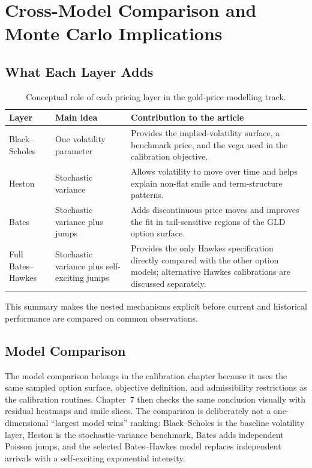 \documentclass[a4paper,10pt,titlepage,oneside,openany]{book}
\theoremstyle{plain}
\theoremstyle{definition}
\theoremstyle{remark}
\begin{document}
\chapter{Cross-Model Comparison and Monte Carlo Implications}

\section{What Each Layer Adds}

\begin{table}[H]
\centering
\begin{tabularx}{\textwidth}{@{}p{3.2cm}p{4.2cm}X@{}}
\toprule
\textbf{Layer} & \textbf{Main idea} & \textbf{Contribution to the article} \\
\midrule
Black--Scholes & One volatility parameter & Provides the implied-volatility surface, a benchmark price, and the vega used in the calibration objective. \\
Heston & Stochastic variance & Allows volatility to move over time and helps explain non-flat smile and term-structure patterns. \\
Bates & Stochastic variance plus jumps & Adds discontinuous price moves and improves the fit in tail-sensitive regions of the GLD option surface. \\
Full Bates--Hawkes & Stochastic variance plus self-exciting jumps & Provides the only Hawkes specification directly compared with the other option models; alternative Hawkes calibrations are discussed separately. \\
\bottomrule
\end{tabularx}
\caption{Conceptual role of each pricing layer in the gold-price modelling track.}
\label{tab:model-layers}
\end{table}

This summary makes the nested mechanisms explicit before current and historical performance are compared on common observations.



\section{Model Comparison}

The model comparison belongs in the calibration chapter because it uses the same sampled option surface, objective definition, and admissibility restrictions as the calibration routines. Chapter~7 then checks the same conclusion visually with residual heatmaps and smile slices. The comparison is deliberately not a one-dimensional ``largest model wins'' ranking: Black--Scholes is the baseline volatility layer, Heston is the stochastic-variance benchmark, Bates adds independent Poisson jumps, and the selected Bates--Hawkes model replaces independent arrivals with a self-exciting exponential intensity.
\end{document}

